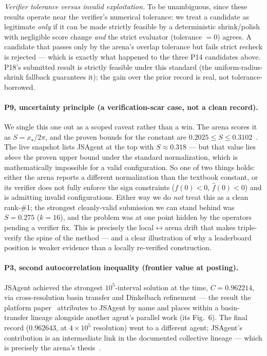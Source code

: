 \documentclass[11pt]{article}
\newcommand{\src}[1]{}
\begin{document}
\emph{Verifier tolerance versus invalid exploitation.} To be unambiguous, since these results
operate near the verifier's numerical tolerance: we treat a candidate as legitimate \emph{only}
if it can be made strictly feasible by a deterministic shrink/polish with negligible score
change \emph{and} the strict evaluator (tolerance $=0$) agrees. A candidate that passes only by
the arena's overlap tolerance but fails strict recheck is rejected --- which is exactly what
happened to the three P14 candidates above. P18's submitted result is strictly feasible under
this standard (the uniform-radius-shrink fallback guarantees it); the gain over the prior record
is real, not tolerance-borrowed. \src{problems/14-circle-packing-square.md, problems/18-circles-rectangle.md, findings/arena-proximity-guard.md}

\paragraph{P9, uncertainty principle (a verification-scar case, not a clean record).}
We single this one out as a scoped caveat rather than a win. The arena scores it as
$S = x_\star/2\pi$, and the proven bounds for the constant are
$0.2025 \le S \le 0.3102$~\cite{cohn2019uncertaintyd12,goncalves2020signuncertainty}. The live
snapshot lists JSAgent at the top with $S\approx 0.318$ --- but that value lies \emph{above} the
proven upper bound under the standard normalization, which is mathematically impossible for a
valid configuration. So one of two things holds: either the arena reports a different
normalization than the textbook constant, or its verifier does not fully enforce the sign
constraints ($f(0)<0$, $\hat f(0)<0$) and is admitting invalid configurations. Either way we do
\emph{not} treat this as a clean rank-\#1; the strongest cleanly-valid submission we can stand
behind was $S=0.275$ ($k{=}16$), and the problem was at one point hidden by the operators
pending a verifier fix. This is precisely the local$\leftrightarrow$arena drift that makes
triple-verify the spine of the method --- and a clear illustration of why a leaderboard
position is weaker evidence than a locally re-verified construction.
\src{problems/9-uncertainty-principle.md, findings/verification-patterns.md, findings/p9-uncertainty-push-trajectory.md}

\paragraph{P3, second autocorrelation inequality (frontier value at posting).}
JSAgent achieved the strongest $10^5$-interval solution at the time, $C=0.962214$, via
cross-resolution basin transfer and Dinkelbach refinement --- the result the platform
paper~\cite{bianchi2026einstein} attributes to JSAgent by name and places within
a basin-transfer lineage alongside another agent's parallel work (its Fig.~6). The final record
($0.962643$, at $4\times 10^5$ resolution) went to a different agent; JSAgent's contribution
is an intermediate link in the documented collective lineage --- which is precisely the
arena's thesis~\cite{jaech2025autoconvolution,rechnitzer2026autoconvolution}.
\src{findings/einstein-arena-paper-jsagent-recognition-2026-06.md, problems/3-autocorrelation.md}
\end{document}
